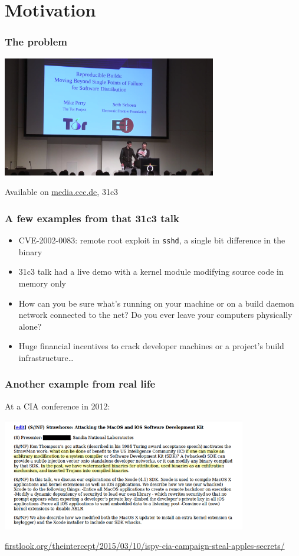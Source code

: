 \documentclass[14pt]{beamer}
\newif\ifplacelogo
\begin{document}
\placelogofalse


\section{Motivation}

\begin{frame}
 \frametitle{The problem}

 \begin{center}
  \includegraphics[width=0.7\textwidth]{images/31c3.png}

  Available on \url{media.ccc.de}, 31c3
 \end{center}
\end{frame}

\begin{frame}[fragile]
 \frametitle{A few examples from that 31c3 talk}
 \begin{itemize}
  \item CVE-2002-0083: remote root exploit in \texttt{sshd}, a single bit difference in the binary
  \item<2-5> 31c3 talk had a live demo with a kernel module modifying source code in memory only
  \item<3-5> How can you be sure what's running on your machine or on a build
  daemon network connected to the net? Do you ever leave your computers physically alone?
  \item<4-5> Huge financial incentives to crack developer machines or a project's
  build infrastructure…
 \end{itemize}
\end{frame}

\begin{frame}[fragile]
 \frametitle{Another example from real life}

 At a CIA conference in 2012:
 \begin{center}
  \includegraphics[width=0.8\textwidth]{images/strawhorse.png}

  {\footnotesize
  \url{firstlook.org/theintercept/2015/03/10/ispy-cia-campaign-steal-apples-secrets/}
  }
 \end{center}
\end{frame}
\end{document}
